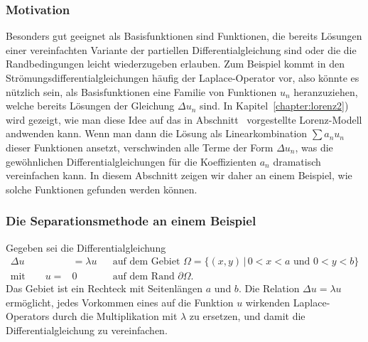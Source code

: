 \subsubsection{Motivation}
Besonders gut geeignet als Basisfunktionen sind Funktionen, die bereits
Lösungen einer vereinfachten Variante der partiellen Differentialgleichung
sind oder die die Randbedingungen leicht wiederzugeben erlauben.
Zum Beispiel kommt in den Strömungsdifferentialgleichungen häufig der
Laplace-Operator vor, also könnte es nützlich sein, als Basisfunktionen
eine Familie von Funktionen $u_n$ heranzuziehen, welche bereits Lösungen
der Gleichung $\Delta u_n$ sind. In Kapitel~\ref{chapter:lorenz2}) wird
gezeigt, wie man diese Idee auf das in
Abschnitt~\label{section:lorenz-modell} vorgestellte Lorenz-Modell
andwenden kann.
Wenn man dann die Lösung als Linearkombination $\sum a_nu_n$ dieser Funktionen
ansetzt, verschwinden alle Terme der Form $\Delta u_n$, was die gewöhnlichen
Differentialgleichungen für die Koeffizienten $a_n$ dramatisch vereinfachen
kann.
In diesem Abschnitt zeigen wir daher an einem Beispiel, wie solche Funktionen
gefunden werden können. 

\subsubsection{Die Separationsmethode an einem Beispiel}
Gegeben sei die Differentialgleichung
\[
\begin{aligned}
\Delta u &= \lambda u&&
\text{auf dem Gebiet $\Omega=\{ (x,y)\,|\, 0<x<a\text{ und }0<y<b\}$}
\\
\text{mit}
\qquad
u=&0&&\text{auf dem Rand $\partial\Omega$.}
\end{aligned}
\]
Das Gebiet ist ein Rechteck mit Seitenlängen $a$ und $b$.
Die Relation $\Delta u=\lambda u$ ermöglicht, jedes Vorkommen eines auf
die Funktion $u$ wirkenden Laplace-Operators durch die Multiplikation
mit $\lambda$ zu ersetzen, und damit die Differentialgleichung zu vereinfachen.

